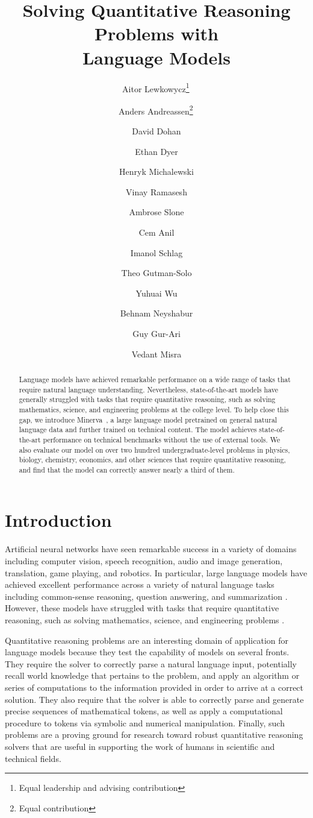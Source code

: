 \documentclass{article}
\title{\bf{Solving Quantitative Reasoning Problems with \\ Language Models}}
\author{Aitor Lewkowycz\thanks{Equal leadership and advising contribution}\;\,}
\author{Anders Andreassen\thanks{Equal contribution}\;\,}
\author{David Dohan}
\author{Ethan Dyer}
\author{Henryk Michalewski}
\author{\authorcr Vinay Ramasesh}
\author{Ambrose Slone}
\author{Cem Anil}
\author{Imanol Schlag}
\author{Theo Gutman-Solo}
\author{\authorcr Yuhuai Wu}
\author{Behnam Neyshabur}
\author{Guy Gur-Ari}
\author{Vedant Misra}
\affil{Google Research}
\date{}
\newcommand{\ourmodel}[0]{{Minerva~}}
\begin{document}
\setlength{\parindent}{0em}
\setlength{\parskip}{1ex}

\maketitle

\begin{abstract}
Language models have achieved remarkable performance on a wide range of
tasks that require natural language understanding.
Nevertheless, state-of-the-art models have generally struggled with tasks that require quantitative reasoning, such as solving mathematics, science, and engineering problems at the college level.
To help close this gap, we introduce \ourmodel\!, a large language model pretrained on general natural language data and further trained on technical content. 
The model achieves state-of-the-art performance on technical benchmarks without the use of external tools. 
We also evaluate our model on over two hundred undergraduate-level problems in physics, biology, chemistry, economics, and other sciences that require quantitative reasoning, and find that the model can correctly answer nearly a third of them.
\end{abstract}


\section{Introduction}

\label{sec:introduction}
Artificial neural networks have seen remarkable success in a variety of domains including computer vision, speech recognition, audio and image generation, translation, game playing, and robotics. In particular, large language models have achieved excellent performance across a variety of natural language tasks including common-sense reasoning, question answering, and summarization \citep{raffel2019exploring,gpt3,rae2021scaling,smith2022using,palm}. However, these models have struggled with tasks that require quantitative reasoning, such as solving mathematics, science, and engineering problems \citep{MATH,gsm8k}.

Quantitative reasoning problems are an interesting domain of application for language models because they test the capability of models on several fronts. They require the solver to correctly parse a natural language input, potentially recall world knowledge that pertains to the problem, and apply an algorithm or series of computations to the information provided in order to arrive at a correct solution. They also require that the solver is able to correctly parse and generate precise sequences of mathematical tokens, as well as apply a computational procedure to tokens via symbolic and numerical manipulation. Finally, such problems are a proving ground for research toward robust quantitative reasoning solvers that are useful in supporting the work of humans in scientific and technical fields.
\end{document}
